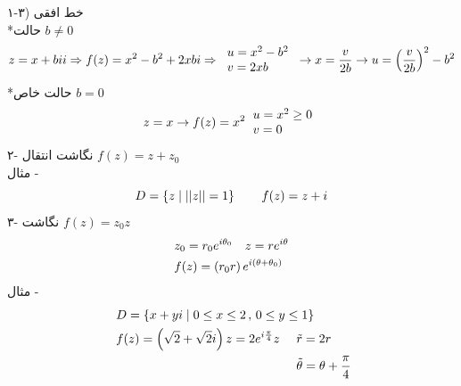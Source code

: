 ۱-۳) خط افقی\\
*حالت $b\ne0$
\[\begin{aligned}
	z=x+bii\Rightarrow f(z)=x^2-b^2+2xbi \Rightarrow
	\begin{tabular}{l}
		$u=x^2-b^2$
		\\
		$v=2xb$
	\end{tabular}\rightarrow x=\frac v{2b}
	\rightarrow u=\pr{\frac v{2b}}^2-b^2
\end{aligned}\]
*حالت خاص $b=0$
\[
	z=x\rightarrow f(z)=x^2
\begin{tabular}{l}
	$u=x^2\ge0$
	\\
	$v=0$
\end{tabular}
\]
۲- نگاشت انتقال
$f(z)=z+z_0$
\\
مثال -
\[
D=\left\{z\mid\left|\left| z \right|\right|=1\right\} \qquad f(z)=z+i
\]
۳- نگاشت
$f(z)=z_0z$
\[\begin{aligned}
	& z_0=r_0e^{i\theta_0} \quad z=re^{i\theta}
	\\ &
	f(z)=\left(r_0r\right)e^{i\left(\theta+\theta_0\right)}
\end{aligned}\]
مثال -
\[\begin{aligned}
	&\ D=\left\{x+yi\mid0\le x\le 2 \, , \, 0\le y\le1\right\}
	\\ &\
	\begin{aligned}
	f(z)=\left(\sqrt2+\sqrt2i\right)z=2e^{i\frac\pi4}z\quad &\ \tilde{r}=2r
	\\ &\
	\tilde{\theta}=\theta+\frac\pi4
	\end{aligned}
\end{aligned}\]
